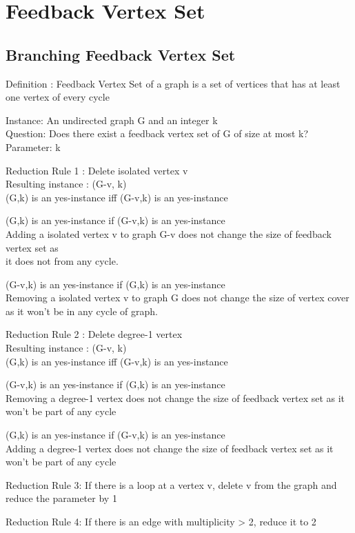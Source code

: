 \chapter{Feedback Vertex Set}

\section{Branching Feedback Vertex Set}
Definition : Feedback Vertex Set of a graph is a set of vertices that has at
least one vertex of every cycle

Instance: An undirected graph G and an integer k \\
Question: Does there exist a feedback vertex set of G of size at most k?
Parameter: k


Reduction Rule 1 : Delete isolated vertex v \\
Resulting instance : (G-v, k) \\
(G,k) is an yes-instance iff (G-v,k) is an yes-instance

(G,k) is an yes-instance if (G-v,k) is an yes-instance\\
Adding a isolated vertex v to graph G-v does not change the size of feedback vertex set as \\
it does not from any cycle.

(G-v,k) is an yes-instance if (G,k) is an yes-instance\\
Removing a isolated vertex v to graph G does not change the size of vertex cover as 
it won't be in any cycle of graph.

Reduction Rule 2 : Delete degree-1 vertex \\
Resulting instance : (G-v, k) \\
(G,k) is an yes-instance iff (G-v,k) is an yes-instance

(G-v,k) is an yes-instance if (G,k) is an yes-instance \\
Removing a degree-1 vertex does not change the size of feedback vertex set as it won't be part 
of any cycle

(G,k) is an yes-instance if (G-v,k) is an yes-instance\\
Adding a degree-1 vertex does not change the size of feedback vertex set as it won't be part 
of any cycle

Reduction Rule 3: If there is a loop at a vertex v, delete v from the graph
and reduce the parameter by 1 

Reduction Rule 4: If there is an edge with multiplicity > 2, reduce it to 2


